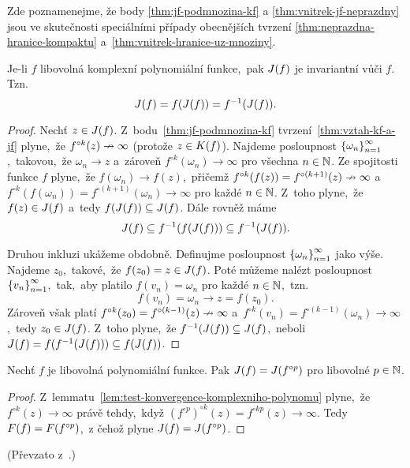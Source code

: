 Zde poznamenejme, že body \ref{thm:jf-podmnozina-kf} a \ref{thm:vnitrek-jf-neprazdny} jsou ve skutečnosti speciálními případy obecnějších tvrzení \ref{thm:neprazdna-hranice-kompaktu} a~\ref{thm:vnitrek-hranice-uz-mnoziny}.
\begin{theorem}\label{invariance-jf}
    Je-li $f$ libovolná komplexní polynomiální funkce,~pak $J(f)$ je invariantní vůči $f$. Tzn.
    \[J(f)=f(J(f))=f^{-1}(J(f)).\]
\end{theorem}
\begin{proof}
    Nechť $z\in J(f)$. Z~bodu~\ref{thm:jf-podmnozina-kf} tvrzení~\ref{thm:vztah-kf-a-jf} plyne,~že $f^{\circ k}(z)\nrightarrow\infty$ (protože $z\in K(f)$). Najdeme posloupnost $\left\{\omega_n\right\}_{n=1}^\infty$,~takovou,~že $\omega_n\to z$ a~zároveň $f^{\circ k}(\omega_n)\to\infty$ pro všechna $n\in\mathbb{N}$. Ze spojitosti funkce $f$ plyne,~že $f(\omega_n)\to f(z)$,~přičemž $f^{\circ k}(f(z))=f^{\circ(k+1)}(z)\nrightarrow\infty$ a~$f^{\circ k}(f(\omega_n))=f^{\circ(k+1)}(\omega_n)\to\infty$ pro každé $n\in\mathbb{N}$. Z~toho plyne,~že $f(z)\in J(f)$ a~tedy $f(J(f))\subseteq J(f)$. Dále rovněž máme
    \[J(f)\subseteq f^{-1}(f(J(f)))\subseteq f^{-1}(J(f)).\]

    Druhou inkluzi ukážeme obdobně. Definujme posloupnost $\left\{\omega_n\right\}_{n=1}^\infty$ jako výše. Najdeme $z_0$,~takové,~že $f(z_0)=z\in J(f)$. Poté můžeme nalézt posloupnost $\left\{v_n\right\}_{n=1}^\infty$,~tak,~aby platilo $f(v_n)=\omega_n$ pro každé $n\in\mathbb{N}$,~tzn.
    \[f(v_n)=\omega_n\to z=f(z_0).\]
    Zároveň však platí $f^{\circ k}(z_0)=f^{\circ(k-1)}(z)\nrightarrow\infty$ a~$f^{\circ k}(v_n)=f^{\circ(k-1)}(\omega_n)\to\infty$,~tedy $z_0\in J(f)$. Z~toho plyne,~že $f^{-1}(J(f))\subseteq J(f)$,~neboli $J(f)=f(f^{-1}(J(f)))\subseteq f(J(f))$.
\end{proof}
\begin{theorem}\label{ekvivalence-jf-a-jfp}
    Nechť $f$ je libovolná polynomiální funkce. Pak $J(f)=J(f^{\circ p})$ pro libovolné $p\in\mathbb{N}$.
\end{theorem}
\begin{proof}
    Z~lemmatu~\ref{lem:test-konvergence-komplexniho-polynomu} plyne,~že $f^{\circ k}(z)\to\infty$ právě tehdy,~když $(f^{\circ p})^{\circ k}(z)=f^{\circ kp}(z)\to\infty$. Tedy $F(f)=F(f^{\circ p})$,~z čehož plyne $J(f)=J(f^{\circ p})$.
\end{proof}
(Převzato z~\citep[str. 238]{Falconer1989}.)

